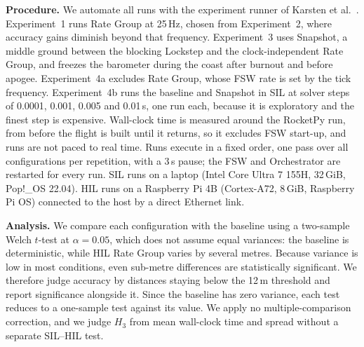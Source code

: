 \textbf{Procedure.} We automate all runs with the experiment runner of Karsten et al.~\cite{karsten2026experiment-runner}. Experiment~1 runs Rate Group at 25\,Hz, chosen from Experiment~2, where accuracy gains diminish beyond that frequency. Experiment~3 uses Snapshot, a middle ground between the blocking Lockstep and the clock-independent Rate Group, and freezes the barometer during the coast after burnout and before apogee. Experiment~4a excludes Rate Group, whose FSW rate is set by the tick frequency. Experiment~4b runs the baseline and Snapshot in SIL at solver steps of 0.0001, 0.001, 0.005 and 0.01\,s, one run each, because it is exploratory and the finest step is expensive. Wall-clock time is measured around the RocketPy run, from before the flight is built until it returns, so it excludes FSW start-up, and runs are not paced to real time. Runs execute in a fixed order, one pass over all configurations per repetition, with a 3\,s pause; the FSW and Orchestrator are restarted for every run. SIL runs on a laptop (Intel Core Ultra 7 155H, 32\,GiB, Pop!\_OS 22.04). HIL runs on a Raspberry Pi 4B (Cortex-A72, 8\,GiB, Raspberry Pi OS) connected to the host by a direct Ethernet link.

\textbf{Analysis.} We compare each configuration with the baseline using a two-sample Welch $t$-test at $\alpha=0.05$, which does not assume equal variances: the baseline is deterministic, while HIL Rate Group varies by several metres. Because variance is low in most conditions, even sub-metre differences are statistically significant. We therefore judge accuracy by distances staying below the 12\,m threshold and report significance alongside it. Since the baseline has zero variance, each test reduces to a one-sample test against its value. We apply no multiple-comparison correction, and we judge $H_3$ from mean wall-clock time and spread without a separate SIL--HIL test.
